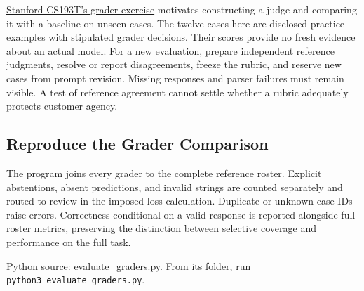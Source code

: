 \href{https://web.stanford.edu/class/archive/cs/cs193t/cs193t.1272/assignments/7-evals/}{Stanford
CS193T's grader exercise} motivates constructing a judge and comparing
it with a baseline on unseen cases. The twelve cases here are disclosed
practice examples with stipulated grader decisions. Their scores provide
no fresh evidence about an actual model. For a new evaluation, prepare
independent reference judgments, resolve or report disagreements, freeze
the rubric, and reserve new cases from prompt revision. Missing
responses and parser failures must remain visible. A test of reference
agreement cannot settle whether a rubric adequately protects customer
agency.

\hypertarget{M05-reproduce-the-grader-comparison}{%
\subsection{Reproduce the Grader
Comparison}\label{M05-reproduce-the-grader-comparison}}

\noindent \noindent The program joins every grader to the complete reference
roster. Explicit abstentions, absent predictions, and invalid strings
are counted separately and routed to review in the imposed loss
calculation. Duplicate or unknown case IDs raise errors. Correctness
conditional on a valid response is reported alongside full-roster
metrics, preserving the distinction between selective coverage and
performance on the full task.

\FloatBarrier
{}
Python source:
\href{../03_Data_and_Code/AI_Evidence_and_Evaluation/evaluate_graders.py}{evaluate\_graders.py}.
From its folder, run \texttt{python3\ evaluate\_graders.py}.


